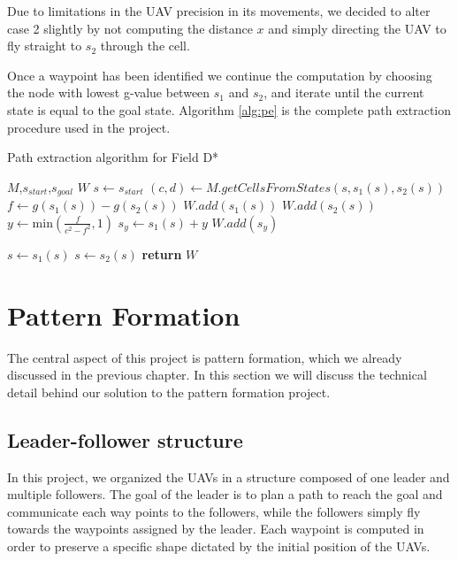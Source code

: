 Due to limitations in the UAV precision in its movements, we decided to alter case 2 slightly by
not computing the distance $x$ and simply directing the UAV to fly straight to $s_2$ through the 
cell. 

Once a waypoint has been identified we continue the computation by choosing the node with lowest
g-value between $s_1$ and $s_2$, and iterate until the current state is equal to the goal state. 
Algorithm \ref{alg:pe} is the complete path extraction procedure used in the project.

\begin{algorithm}
	\algrenewcommand{}
	\algrenewcommand{}
	\caption{Path extraction algorithm for Field D*}\label{alg:pe}
	\begin{algorithmic}[1]
		\Require $M$,$s_{start}$,$s_{goal}$
		\Ensure $W$
		\State $s \gets s_{start}$ 
			\State $(c,d) \gets M.getCellsFromStates(s,s_1(s),s_2(s))$
			\State $f \gets g(s_1(s)) - g(s_2(s))$ 
				\State $W.add(s_1(s))$ 
				\State $W.add(s_2(s))$
			\Else
				\State $y \gets \mathrm{min}\left(\frac{f}{c^2 - f^2},1\right)$ 
				\State $s_y \gets s_1(s) + y$
				\State $W.add(s_y)$
			\EndIf

			\State $s \gets s_1(s)$
			\Else
			\State $s \gets s_2(s)$
			\EndIf
		\EndWhile
		\State \textbf{return} $W$
		\EndFunction
	\end{algorithmic}
\end{algorithm}

\newpage

\section{Pattern Formation}

The central aspect of this project is pattern formation, which we already
discussed in the previous chapter. In this section we will discuss the technical
detail behind our solution to the pattern formation project. 

\subsection{Leader-follower structure}

In this project, we organized the UAVs in a structure composed of one leader and
multiple followers. The goal of the leader is to plan a path to reach the goal
and communicate each way points to the followers, while the followers simply
fly towards the waypoints assigned by the leader. Each waypoint is computed in 
order to preserve a specific shape dictated by the initial position of the UAVs.

